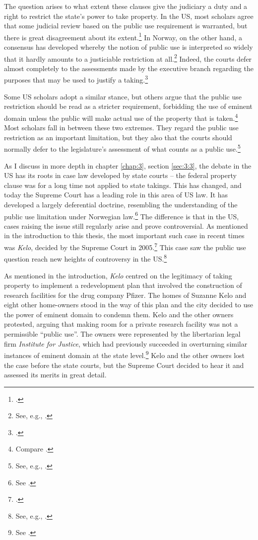 The question arises to what extent these clauses give the judiciary a duty and a right to restrict the state's power to take property. In the US, most scholars agree that some judicial review based on the public use requirement is warranted, but there is great disagreement about its extent.\footcite[205]{berger78} In Norway, on the other hand, a consensus has developed whereby the notion of public use is interpreted so widely that it hardly amounts to a justiciable restriction at all.\footnote{See, e.g., \cite[368]{aall10}.} Indeed, the courts defer almost completely to the assessments made by the executive branch regarding the purposes that may be used to justify a taking.\footcite[368]{aall10}

Some US scholars adopt a similar stance, but others argue that the public use restriction should be read as a stricter requirement, forbidding the use of eminent domain unless the public will make actual use of the property that is taken.\footnote{Compare \cite{bell06,bell09,claeys04,sandefur06}.} Most scholars fall in between these two extremes. They regard the public use restriction as an important limitation, but they also  that the courts should normally defer to the legislature's assessment of what counts as a public use.\footnote{See, e.g., \cite{merrill86,alexander05}.}

As I discuss in more depth in chapter \ref{chap:3}, section \ref{sec:3:3}, the debate in the US has its roots in case law developed by state courts -- the federal property clause was for a long time not applied to state takings. This has changed, and today the Supreme Court has a leading role in this area of US law. It has developed a largely deferential doctrine, resembling the understanding of the public use limitation under Norwegian law.\footnote{See \cite{berman54,midkiff84,kelo05}.} The difference is that in the US, cases raising the issue still regularly arise and prove controversial. As mentioned in the introduction to this thesis, the most important such case in recent times was {\it Kelo}, decided by the Supreme Court in 2005.\footcite{kelo05} This case saw the public use question reach new heights of controversy in the US.\footnote{See, e.g., \cite{somin09}.}

As mentioned in the introduction, {\it Kelo} centred on the legitimacy of taking property to implement a redevelopment plan that involved the construction of research facilities for the drug company Pfizer. The homes of Suzanne Kelo and eight other home-owners stood in the way of this plan and the city decided to use the power of eminent domain to condemn them. Kelo and the other owners protested, arguing that making room for a private research facility was not a permissible ``public use''. The owners were represented by the libertarian legal firm {\it Institute for Justice}, which had previously succeeded in overturning similar instances of eminent domain at the state level.\footnote{See \cite{justice15}.} Kelo and the other owners lost the case before the state courts, but the Supreme Court decided to hear it and assessed its merits in great detail.

